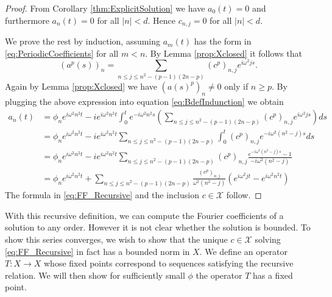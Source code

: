 \documentclass{article}
\newcommand{\cX}{\mathcal{X}}
\begin{document}
\begin{proof}
	From Corollary \ref{thm:ExplicitSolution} we have 
	$a_0(t) = 0$ and furthermore $ a_n(t) =0$ for all $ |n| < d$. 
	Hence $ c_{n,j} =0$ for all $|n|<d$. 
	
	We prove the rest by induction, assuming $a_m(t)$ has the form in \eqref{eq:PeriodicCoefficients} for all $ m < n$. 
	By Lemma \ref{prop:Xclosed}  it   follows that  
	\[
(	a^p(s))_n =
	\sum_{ 
		n \leq j \leq n^2 - (p-1)(2n-p)
	}
	(c^p)_{n,j} e^{i \omega^2 j s} .
	\]
Again 	by Lemma \ref{prop:Xclosed} we have $ (a(s)^p)_n  \neq 0$ only if $ n \geq p$. 
By plugging the above expression  into equation  \eqref{eq:BdefIndunction} we obtain  
	\begin{align*}
	a_n(t) &= \phi_n e^{i \omega^2 n^2 t}  - i e^{i \omega^2 n^2 t} 
	\int_0^t 
	e^{-i \omega^2 n^2 s}
	\left(
	\sum_{ 
		 n \leq j \leq n^2 - (p-1)(2n-p)
	}
	(c^p)_{n,j} e^{i \omega^2 j s}
	\right)
	ds 
	\nonumber
	\\
	&= 
	\phi_n e^{i \omega^2 n^2 t}  - i e^{i \omega^2 n^2 t} 
		\sum_{ 
		n \leq j \leq n^2 - (p-1)(2n-p)
	}
	\int_0^t 
	(c^p)_{n,j} e^{-i \omega^2 (n^2-j) s}
	ds 
\\
		&= 
	\phi_n e^{i \omega^2 n^2 t}  - i e^{i \omega^2 n^2 t} 
	\sum_{ 
		n \leq j \leq n^2 - (p-1)(2n-p)
	}
(c^p)_{n,j}
\frac{	 e^{-i \omega^2 (n^2-j) s} -1 }{- i \omega^2 (n^2-j)}	
\\
	&= 
	\phi_n e^{i \omega^2 n^2 t}  + 
	\sum_{ 
		n \leq j \leq n^2 - (p-1)(2n-p)
	}
	\frac{	 	(c^p)_{n,j} }{ \omega^2 (n^2-j)}	
	\left(
	e^{i \omega^2 j t} - e^{i \omega^2 n^2 t} 
	\right)
	\label{eq:Bintegral}
	\end{align*} 
The formula in \eqref{eq:FF_Recursive}  and the inclusion $c \in \cX$ follow. 
	
\end{proof}






With this recursive definition, we can compute the Fourier coefficients of a solution to any order.
However it is not clear whether the solution is bounded. 
To show this series  converges, we wish to show that the unique $ c \in \cX$ solving \eqref{eq:FF_Recursive} in fact  has a bounded norm in $ X$. We define an operator $ T: X \to X$ whose fixed points correspond to sequences satisfying the recursive relation. 
We will then show for sufficiently small $\phi$ the operator $T$ has a fixed point. 
\end{document}
